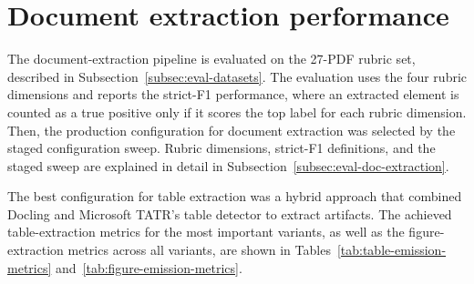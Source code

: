 \section{Document extraction performance}\label{section:results-doc-extraction-performance}

The document-extraction pipeline is evaluated on the 27-PDF rubric set, described in Subsection~\ref{subsec:eval-datasets}. The evaluation uses the four rubric dimensions and reports the strict-F1 performance, where an extracted element is counted as a true positive only if it scores the top label for each rubric dimension. Then, the production configuration for document extraction was selected by the staged configuration sweep. Rubric dimensions, strict-F1 definitions, and the staged sweep are explained in detail in Subsection~\ref{subsec:eval-doc-extraction}. 

The best configuration for table extraction was a hybrid approach that combined Docling and Microsoft TATR's table detector to extract artifacts. The achieved table-extraction metrics for the most important variants, as well as the figure-extraction metrics across all variants, are shown in Tables~\ref{tab:table-emission-metrics} and~\ref{tab:figure-emission-metrics}.

